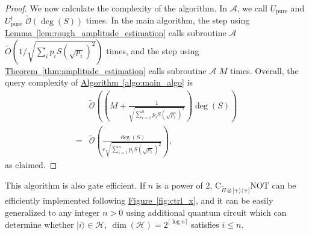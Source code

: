 \documentclass[journal]{IEEEtran}
\newcommand{\thm}[1]{\hyperref[thm:#1]{Theorem~\ref*{thm:#1}}}
\newcommand{\lem}[1]{\hyperref[lem:#1]{Lemma~\ref*{lem:#1}}}
\newcommand{\fig}[1]{\hyperref[fig:#1]{Figure~\ref*{fig:#1}}}
\newcommand{\algo}[1]{\hyperref[algo:#1]{Algorithm~\ref*{algo:#1}}}
\newcommand{\xzw}[1]{{\color{blue}{Xinzhao: \textbf{#1}}}}
\newcommand{\syzn}[1]{{\color{violet}{#1}}}
\begin{document}
\begin{proof}



We now calculate the complexity of the algorithm.
In $\mathcal{A}$, we call $U_{\mathrm{pure}}$ and $U_{\mathrm{pure}}^{\dagger}$ $\widetilde{\mathcal{O}}(\deg(S))$ times. In the main algorithm, the step using \lem{rough_amplitude_estimation} calls subroutine $\mathcal{A}$  $\tilde O(1/\sqrt{\sum_i p_i S(\sqrt{p_i})^2})$ times, and the step using \thm{amplitude_estimation} calls subroutine $\mathcal{A}$  $M$ times. Overall, the query complexity of \algo{main_algo}  is \begin{align}&\widetilde{\mathcal{O}}\left(\left(M+\frac{1}{\sqrt{\sum_{i=1}^n p_iS(\sqrt{p_i})^2}}\right)\deg(S)\right) \nonumber \\ =& \widetilde{\mathcal{O}}\left(\frac{\deg(S)}{\epsilon\sqrt{\sum_{i=1}^n p_iS(\sqrt{p_i})^2}}\right),\end{align}
as claimed.
\end{proof}

This algorithm is also gate efficient. If $n$ is a power of 2, $\text{C}_{\widetilde{\Pi }\otimes|+\rangle\langle+|}\text{NOT}$ can be efficiently implemented following \fig{ctrl_x}, and it can be easily generalized to any integer $n > 0
$ using additional quantum circuit which can determine whether $|i\rangle \in \mathcal{H},\ \dim(\mathcal{H}) = 2^{\lceil\log n\rceil}$ satisfies $i\le n$. %
\end{document}
